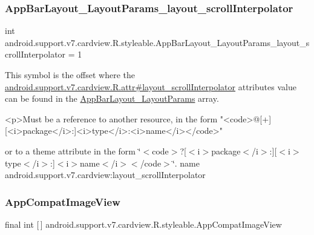 \subsubsection{\texorpdfstring{App\+Bar\+Layout\+\_\+\+Layout\+Params\+\_\+layout\+\_\+scroll\+Interpolator}{AppBarLayout\_LayoutParams\_layout\_scrollInterpolator}}
{\footnotesize\ttfamily int android.\+support.\+v7.\+cardview.\+R.\+styleable.\+App\+Bar\+Layout\+\_\+\+Layout\+Params\+\_\+layout\+\_\+scroll\+Interpolator = 1\hspace{0.3cm}{\ttfamily [static]}}

This symbol is the offset where the \hyperlink{classandroid_1_1support_1_1v7_1_1cardview_1_1R_1_1attr_ac91c12ea99bd6244f37f8789fbc60d94}{android.\+support.\+v7.\+cardview.\+R.\+attr\#layout\+\_\+scroll\+Interpolator} attribute\textquotesingle{}s value can be found in the \hyperlink{classandroid_1_1support_1_1v7_1_1cardview_1_1R_1_1styleable_af9edb99ce8a17a0ba323d6a695308d5d}{App\+Bar\+Layout\+\_\+\+Layout\+Params} array.

\begin{DoxyVerb}      <p>Must be a reference to another resource, in the form "<code>@[+][<i>package</i>:]<i>type</i>:<i>name</i></code>"
\end{DoxyVerb}
 or to a theme attribute in the form \char`\"{}$<$code$>$?\mbox{[}$<$i$>$package$<$/i$>$\+:\mbox{]}\mbox{[}$<$i$>$type$<$/i$>$\+:\mbox{]}$<$i$>$name$<$/i$>$$<$/code$>$\char`\"{}.  name android.\+support.\+v7.\+cardview\+:layout\+\_\+scroll\+Interpolator \mbox{\label{classandroid_1_1support_1_1v7_1_1cardview_1_1R_1_1styleable_ae53f264fbfeb101a6955fa11b459709d}} 
\subsubsection{\texorpdfstring{App\+Compat\+Image\+View}{AppCompatImageView}}
{\footnotesize\ttfamily final int \mbox{[}$\,$\mbox{]} android.\+support.\+v7.\+cardview.\+R.\+styleable.\+App\+Compat\+Image\+View\hspace{0.3cm}{\ttfamily [static]}}

